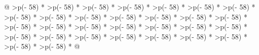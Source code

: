 \documentclass[
]{article}
\begin{document}
\begin{longtable}[]{@{}
  >{\raggedleft\arraybackslash}p{(\columnwidth - 58\tabcolsep) * }
  >{\raggedleft\arraybackslash}p{(\columnwidth - 58\tabcolsep) * }
  >{\raggedleft\arraybackslash}p{(\columnwidth - 58\tabcolsep) * }
  >{\raggedleft\arraybackslash}p{(\columnwidth - 58\tabcolsep) * }
  >{\raggedleft\arraybackslash}p{(\columnwidth - 58\tabcolsep) * }
  >{\raggedleft\arraybackslash}p{(\columnwidth - 58\tabcolsep) * }
  >{\raggedleft\arraybackslash}p{(\columnwidth - 58\tabcolsep) * }
  >{\raggedleft\arraybackslash}p{(\columnwidth - 58\tabcolsep) * }
  >{\raggedleft\arraybackslash}p{(\columnwidth - 58\tabcolsep) * }
  >{\raggedleft\arraybackslash}p{(\columnwidth - 58\tabcolsep) * }
  >{\raggedleft\arraybackslash}p{(\columnwidth - 58\tabcolsep) * }
  >{\raggedleft\arraybackslash}p{(\columnwidth - 58\tabcolsep) * }
  >{\raggedleft\arraybackslash}p{(\columnwidth - 58\tabcolsep) * }
  >{\raggedleft\arraybackslash}p{(\columnwidth - 58\tabcolsep) * }
  >{\raggedleft\arraybackslash}p{(\columnwidth - 58\tabcolsep) * }
  >{\raggedleft\arraybackslash}p{(\columnwidth - 58\tabcolsep) * }
  >{\raggedleft\arraybackslash}p{(\columnwidth - 58\tabcolsep) * }
  >{\raggedleft\arraybackslash}p{(\columnwidth - 58\tabcolsep) * }
  >{\raggedleft\arraybackslash}p{(\columnwidth - 58\tabcolsep) * }
  >{\raggedleft\arraybackslash}p{(\columnwidth - 58\tabcolsep) * }
  >{\raggedleft\arraybackslash}p{(\columnwidth - 58\tabcolsep) * }
  >{\raggedleft\arraybackslash}p{(\columnwidth - 58\tabcolsep) * }
  >{\raggedleft\arraybackslash}p{(\columnwidth - 58\tabcolsep) * }
  >{\raggedleft\arraybackslash}p{(\columnwidth - 58\tabcolsep) * }
  >{\raggedleft\arraybackslash}p{(\columnwidth - 58\tabcolsep) * }
  >{\raggedleft\arraybackslash}p{(\columnwidth - 58\tabcolsep) * }
  >{\raggedleft\arraybackslash}p{(\columnwidth - 58\tabcolsep) * }
  >{\raggedleft\arraybackslash}p{(\columnwidth - 58\tabcolsep) * }
  >{\raggedleft\arraybackslash}p{(\columnwidth - 58\tabcolsep) * }
  >{\raggedleft\arraybackslash}p{(\columnwidth - 58\tabcolsep) * }@{}}
\caption{Learning Categories across Vocational Teachers' Daily Work
Activities (RQ2)}\tabularnewline
\toprule\noalign{}
\begin{minipage}[b]{\linewidth}\raggedleft

\end{minipage}
\end{longtable}
\end{document}

